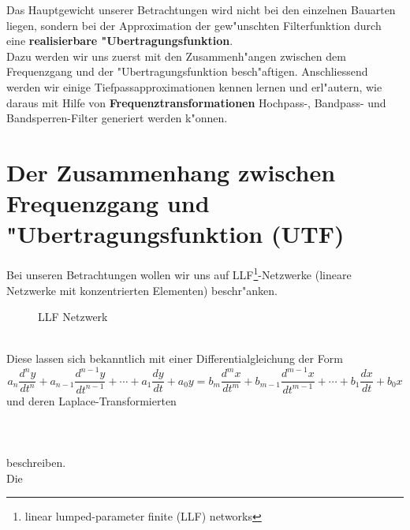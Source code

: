 \nit
Das Hauptgewicht unserer Betrachtungen wird nicht bei den
einzelnen Bauarten liegen, sondern bei der Approximation der gew"unschten
Filterfunktion durch eine
{\bf realisierbare "Ubertragungsfunktion}.\\
Dazu werden wir uns zuerst mit den Zusammenh"angen zwischen
dem Frequenzgang und der "Ubertragungsfunktion besch"aftigen.
Anschliessend werden wir einige Tief\-pass\-approximationen kennen lernen
und erl"autern, wie daraus mit Hilfe von {\bf Frequenztransformationen} Hochpass-, Band\-pass- und Bandsperren-Filter
generiert werden k"onnen.

\clearpage
\section[Zusammenhang Frequenzgang $\leftrightarrow$ UTF]
{Der Zusammenhang zwischen Frequenzgang und "Ubertragungsfunktion
  (UTF)} Bei unseren Betrachtungen wollen wir uns auf
LLF\footnote{linear lumped-parameter finite (LLF) networks}-Netzwerke
(lineare Netzwerke mit konzentrierten
Elementen) beschr"anken.\\
\begin{figure}[!htb]
\begin{center}
  \vspace*{-2mm}\caption{LLF Netzwerk}
\end{center}
\vspace*{-6mm}
\end{figure}\\
Diese lassen sich bekanntlich mit einer Differentialgleichung der Form
\begin{equation*}
a_{n}\frac{d^{n} y}{dt^{n}} + a_{n-1}\frac{d^{n-1} y}{dt^{n-1}} + \cdots +
a_{1}\frac{d y}{dt} + a_{0} y=
b_{m}\frac{d^{m} x}{dt^{m}} + b_{m-1}\frac{d^{m-1} x}{dt^{m-1}} + \cdots +
b_{1}\frac{d x}{dt} + b_{0} x
\end{equation*} 
und deren Laplace-Transformierten\\~~\\
 \\~~\\
beschreiben.\\ Die
